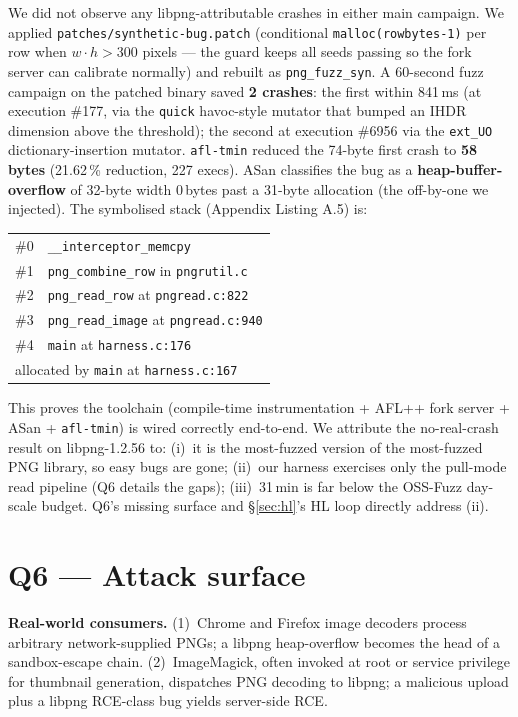 \documentclass[letterpaper,twocolumn,10pt]{article}
\begin{document}
We did not observe any libpng-attributable crashes in either main
campaign. We applied \texttt{patches/synthetic-bug.patch} (conditional
\texttt{malloc(rowbytes-1)} per row when $w \cdot h > 300$ pixels --- the
guard keeps all seeds passing so the fork server can calibrate normally) and
rebuilt as \texttt{png\_fuzz\_syn}. A 60-second fuzz campaign on the patched
binary saved \textbf{2 crashes}: the first within 841\,ms (at execution
\#177, via the \texttt{quick} havoc-style mutator that bumped an IHDR
dimension above the threshold); the second at execution \#6956 via the
\texttt{ext\_UO} dictionary-insertion mutator. \texttt{afl-tmin} reduced the
74-byte first crash to \textbf{58\,bytes} (21.62\,\% reduction, 227 execs).
ASan classifies the bug as a \textbf{heap-buffer-overflow} of 32-byte width
0\,bytes past a 31-byte allocation (the off-by-one we injected). The
symbolised stack (Appendix Listing A.5) is:
\begin{center}\small
\begin{tabular}{ll}
\toprule
\#0 & \texttt{\_\_interceptor\_memcpy}\\
\#1 & \texttt{png\_combine\_row} in \texttt{pngrutil.c}\\
\#2 & \texttt{png\_read\_row} at \texttt{pngread.c:822}\\
\#3 & \texttt{png\_read\_image} at \texttt{pngread.c:940}\\
\#4 & \texttt{main} at \texttt{harness.c:176}\\
\multicolumn{2}{l}{allocated by \texttt{main} at \texttt{harness.c:167}}\\
\bottomrule
\end{tabular}
\end{center}
This proves the toolchain (compile-time instrumentation + AFL++ fork server
+ ASan + \texttt{afl-tmin}) is wired correctly end-to-end. We attribute the
no-real-crash result on libpng-1.2.56 to: (i)~it is the most-fuzzed version
of the most-fuzzed PNG library, so easy bugs are gone; (ii)~our harness
exercises only the pull-mode read pipeline (Q6 details the gaps);
(iii)~31\,min is far below the OSS-Fuzz day-scale budget. Q6's missing
surface and §\ref{sec:hl}'s HL loop directly address (ii).

\section{Q6 — Attack surface}
\label{sec:q6}
\textbf{Real-world consumers.}
(1)~Chrome and Firefox image decoders process arbitrary network-supplied PNGs;
a libpng heap-overflow becomes the head of a sandbox-escape chain.
(2)~ImageMagick, often invoked at root or service privilege for thumbnail
generation, dispatches PNG decoding to libpng; a malicious upload plus a libpng
RCE-class bug yields server-side RCE.
\end{document}
